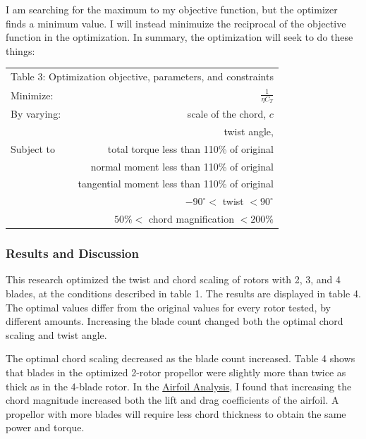 \documentclass{article}
\begin{document}
\raggedright
I am searching for the maximum to my objective function, but the optimizer finds a minimum value. I will instead minimuize the reciprocal of the objective function in the optimization. In summary, the optimization will seek to do these things: \newline

\begin{tabular}{l  r}
	 \multicolumn{2}{c}{Table 3: Optimization objective, parameters, and constraints}  \\
  	Minimize: & $\frac{1}{\eta C_{T}}$ \\ \hline
  	By varying: & scale of the chord, $c$ \\ 
  	 & twist angle, \\  \hline
  	Subject to & total torque less than 110\% of original \\ 
	 & normal moment less than 110\% of original \\ 
	 & tangential moment less than 110\% of original \\ 
	 & $-90^{\circ} <$ twist $< 90^{\circ}$ \\
	 & $50\% <$ chord magnification $< 200\% $
\end{tabular} \newline

\subsubsection*{Results and Discussion}

This research optimized the twist and chord scaling of rotors with 2, 3, and 4 blades, at the conditions described in table 1. The results are displayed in table 4. The optimal values differ from the original values for every rotor tested, by different amounts. Increasing the blade count changed both the optimal chord scaling and twist angle. \newline

The optimal chord scaling decreased as the blade count increased. Table 4 shows that blades in the optimized 2-rotor propellor were slightly more than twice as thick as in the 4-blade rotor. In the \href{https://github.com/JoeSpencer1/497R-Projects/blob/main/Airfoil Analysis/Airfoil_Analysis.pdf}{Airfoil Analysis}, I found that increasing the chord magnitude increased both the lift and drag coefficients of the airfoil. A propellor with more blades will require less chord thickness to obtain the same power and torque. \newline
\end{document}
